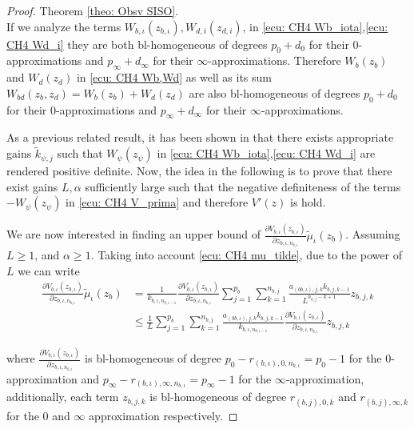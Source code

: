 \documentclass[11pt,letterpaper,twoside,openright]{report}
\begin{document}
\begin{proof}{Theorem \ref{theo: Obsv SISO}. \\}
 	If we analyze the terms $W_{b,\iota}(z_{b,\iota}), W_{d,i}(z_{d,i})$, in \eqref{ecu: CH4 Wb_iota},\eqref{ecu: CH4 Wd_i} they are both bl-homogeneous of degrees $p_0+d_0$ for their $0$-approximations and $p_{\infty}+d_{\infty}$ for their $\infty$-approximations. Therefore $W_b(z_b)$ and $W_d(z_d)$ in \eqref{ecu: CH4 Wb,Wd} as well as its sum $W_{bd}(z_b,z_d)=W_b(z_b) + W_d(z_d)$ are also bl-homogeneous of degrees $p_0+d_0$ for their $0$-approximations and $p_{\infty}+d_{\infty}$ for their $\infty$-approximations.
 	
 	As a previous related result, it has been shown in \cite{Moreno2021} that there exists appropriate gains $\tilde{k}_{\psi,j}$ such that $W_{\psi}(z_{\psi})$ in \eqref{ecu: CH4 Wb_iota},\eqref{ecu: CH4 Wd_i} are rendered positive definite. Now, the idea in the following is to prove that there exist gains $L,\alpha$ sufficiently large such that the negative definiteness of the terms $-W_{\psi}(z_{\psi})$ in \eqref{ecu: CH4 V_prima} and therefore $V'(z)$ is hold.
 	
	We are now interested in finding an upper bound of $\frac{\partial V_{b,\iota}(z_{b,\iota})}{\partial z_{b,\iota,n_{b,\iota}}}\tilde{\mu}_{\iota}(z_b)$. Assuming $L\geq 1$, and $\alpha \geq 1$. Taking into account \eqref{ecu: CH4 mu_tilde}, due to the power of $L$ we can write 
	\begin{equation}
		\begin{split}
			\frac{\partial V_{b,\iota}(z_{b,\iota})}{\partial z_{b,\iota,n_{b,\iota}}}\tilde{\mu}_{\iota}(z_b) &= \frac{1}{k_{b,\iota,n_{b,\iota-1}}}\frac{\partial V_{b,\iota}(z_{b,\iota})}{\partial z_{b,\iota,n_{b,\iota}}}\sum_{j=1}^{p_b}\sum_{k=1}^{n_{b,j}} \frac{a_{(bb,\iota),j,k}k_{b,j,k-1}}{L^{n_{b,j}-k+1}}z_{b,j,k} \\
			& \leq \frac{1}{L} \sum_{j=1}^{p_b}\sum_{k=1}^{n_{b,j}} \frac{a_{(bb,\iota),j,k}k_{b,j,k-1}}{k_{b,\iota,n_{b,\iota-1}}} \frac{\partial V_{b,\iota}(z_{b,\iota})}{\partial z_{b,\iota,n_{b,\iota}}} z_{b,j,k}
		\end{split} 
	\end{equation}

	where $\frac{\partial V_{b,\iota}(z_{b,\iota})}{\partial z_{b,\iota,n_{b,\iota}}}$ is bl-homogeneous of degree $p_0-r_{(b,\iota),0,n_{b,\iota}}=p_0-1$ for the $0$-approximation and $p_{\infty}-r_{(b,\iota),\infty,n_{b,\iota}}=p_{\infty}-1$ for the $\infty$-approximation, additionally, each term $z_{b,j,k}$ is bl-homogeneous of degree $r_{(b,j),0,k}$ and $r_{(b,j),\infty,k}$ for the $0$ and $\infty$ approximation respectively. 
	

\end{proof}
\end{document}
